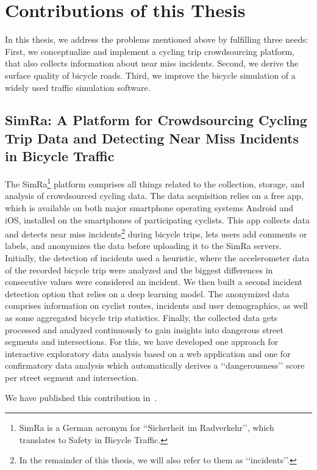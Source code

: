 \section{Contributions of this Thesis}
\label{sec:contributions}
In this thesis, we address the problems mentioned above by fulfilling three needs:
First, we conceptualize and implement a cycling trip crowdsourcing platform, that also collects information about near miss incidents.
Second, we derive the surface quality of bicycle roads.
Third, we improve the bicycle simulation of a widely used traffic simulation software.

\subsection{SimRa: A Platform for Crowdsourcing Cycling Trip Data and Detecting Near Miss Incidents in Bicycle Traffic}
\label{subsec:simra_contribution}
The SimRa\footnote{SimRa is a German acronym for ‘‘Sicherheit im Radverkehr’’, which translates to Safety in Bicycle Traffic.} platform comprises all things related to the collection, storage, and analysis of crowdsourced cycling data.
The data acquisition relies on a free app, which is available on both major smartphone operating systems Android and iOS, installed on the smartphones of participating cyclists.
This app collects data and detects near miss incidents\footnote{In the remainder of this thesis, we will also refer to them as ‘‘incidents’’.} during bicycle trips, lets users add comments or labels, and anonymizes the data before uploading it to the SimRa servers.
Initially, the detection of incidents used a heuristic, where the accelerometer data of the recorded bicycle trip were analyzed and the biggest differences in consecutive values were considered an incident.
We then built a second incident detection option that relies on a deep learning model.
The anonymized data comprises information on cyclist routes, incidents and user demographics, as well as some aggregated bicycle trip statistics.
Finally, the collected data gets processed and analyzed continuously to gain insights into dangerous street segments and intersections.
For this, we have developed one approach for interactive exploratory data analysis based on a web application and one for confirmatory data analysis which automatically derives a ‘‘dangerousness’’ score per street segment and intersection. 

We have published this contribution in~\cite{karakaya2020simra,karakaya2022cyclesense}.

